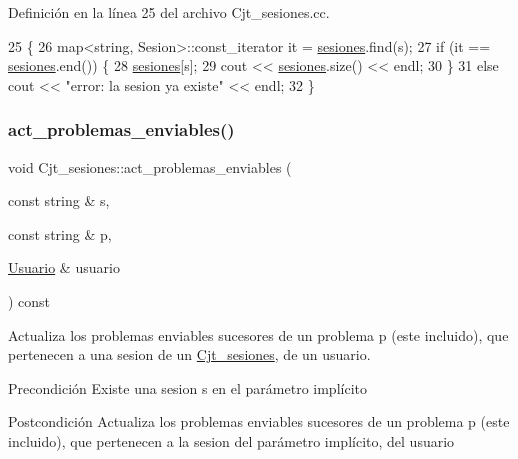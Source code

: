Definición en la línea 25 del archivo Cjt\+\_\+sesiones.\+cc.


\begin{DoxyCode}
25                                                    \{
26       map<string, Sesion>::const\_iterator it = \mbox{\hyperlink{class_cjt__sesiones_a87e835a62e561eeb0f93eedbdcbe1802}{sesiones}}.find(s);
27       \textcolor{keywordflow}{if} (it == \mbox{\hyperlink{class_cjt__sesiones_a87e835a62e561eeb0f93eedbdcbe1802}{sesiones}}.end()) \{
28         \mbox{\hyperlink{class_cjt__sesiones_a87e835a62e561eeb0f93eedbdcbe1802}{sesiones}}[s];
29         cout << \mbox{\hyperlink{class_cjt__sesiones_a87e835a62e561eeb0f93eedbdcbe1802}{sesiones}}.size() << endl;
30       \}
31       \textcolor{keywordflow}{else} cout << \textcolor{stringliteral}{"error: la sesion ya existe"} << endl;
32     \}
\end{DoxyCode}
\mbox{\label{class_cjt__sesiones_a643292089a9534d7eea048df779e00fd}} 
\subsubsection{\texorpdfstring{act\+\_\+problemas\+\_\+enviables()}{act\_problemas\_enviables()}}
{\footnotesize\ttfamily void Cjt\+\_\+sesiones\+::act\+\_\+problemas\+\_\+enviables (\begin{DoxyParamCaption}\item[{const string \&}]{s,  }\item[{const string \&}]{p,  }\item[{\mbox{\hyperlink{class_usuario}{Usuario}} \&}]{usuario }\end{DoxyParamCaption}) const}



Actualiza los problemas enviables sucesores de un problema p (este incluido), que pertenecen a una sesion de un \mbox{\hyperlink{class_cjt__sesiones}{Cjt\+\_\+sesiones}}, de un usuario. 

\begin{DoxyPrecond}{Precondición}
Existe una sesion s en el parámetro implícito 
\end{DoxyPrecond}
\begin{DoxyPostcond}{Postcondición}
Actualiza los problemas enviables sucesores de un problema p (este incluido), que pertenecen a la sesion del parámetro implícito, del usuario 
\end{DoxyPostcond}


